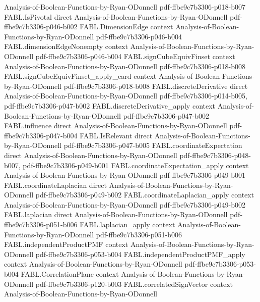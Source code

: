 \begin{theorem}
  {Analysis-of-Boolean-Functions-by-Ryan-ODonnell}
  {pdf-ffbe9c7b3306-p018-b007}
\proofstep
  {FABL.IsPivotal}
  {direct}
  {Analysis-of-Boolean-Functions-by-Ryan-ODonnell}
  {pdf-ffbe9c7b3306-p046-b002}
\proofstep
  {FABL.DimensionEdge}
  {context}
  {Analysis-of-Boolean-Functions-by-Ryan-ODonnell}
  {pdf-ffbe9c7b3306-p046-b004}
\proofstep
  {FABL.dimensionEdgeNonempty}
  {context}
  {Analysis-of-Boolean-Functions-by-Ryan-ODonnell}
  {pdf-ffbe9c7b3306-p046-b004}
\proofstep
  {FABL.signCubeEquivFinset}
  {context}
  {Analysis-of-Boolean-Functions-by-Ryan-ODonnell}
  {pdf-ffbe9c7b3306-p018-b008}
\proofstep
  {FABL.signCubeEquivFinset_apply_card}
  {context}
  {Analysis-of-Boolean-Functions-by-Ryan-ODonnell}
  {pdf-ffbe9c7b3306-p018-b008}
\proofstep
  {FABL.discreteDerivative}
  {direct}
  {Analysis-of-Boolean-Functions-by-Ryan-ODonnell}
  {pdf-ffbe9c7b3306-p014-b005,
    pdf-ffbe9c7b3306-p047-b002}
\proofstep
  {FABL.discreteDerivative_apply}
  {context}
  {Analysis-of-Boolean-Functions-by-Ryan-ODonnell}
  {pdf-ffbe9c7b3306-p047-b002}
\proofstep
  {FABL.influence}
  {direct}
  {Analysis-of-Boolean-Functions-by-Ryan-ODonnell}
  {pdf-ffbe9c7b3306-p047-b004}
\proofstep
  {FABL.IsRelevant}
  {direct}
  {Analysis-of-Boolean-Functions-by-Ryan-ODonnell}
  {pdf-ffbe9c7b3306-p047-b005}
\proofstep
  {FABL.coordinateExpectation}
  {direct}
  {Analysis-of-Boolean-Functions-by-Ryan-ODonnell}
  {pdf-ffbe9c7b3306-p048-b007,
    pdf-ffbe9c7b3306-p049-b001}
\proofstep
  {FABL.coordinateExpectation_apply}
  {context}
  {Analysis-of-Boolean-Functions-by-Ryan-ODonnell}
  {pdf-ffbe9c7b3306-p049-b001}
\proofstep
  {FABL.coordinateLaplacian}
  {direct}
  {Analysis-of-Boolean-Functions-by-Ryan-ODonnell}
  {pdf-ffbe9c7b3306-p049-b002}
\proofstep
  {FABL.coordinateLaplacian_apply}
  {context}
  {Analysis-of-Boolean-Functions-by-Ryan-ODonnell}
  {pdf-ffbe9c7b3306-p049-b002}
\proofstep
  {FABL.laplacian}
  {direct}
  {Analysis-of-Boolean-Functions-by-Ryan-ODonnell}
  {pdf-ffbe9c7b3306-p051-b006}
\proofstep
  {FABL.laplacian_apply}
  {context}
  {Analysis-of-Boolean-Functions-by-Ryan-ODonnell}
  {pdf-ffbe9c7b3306-p051-b006}
\proofstep
  {FABL.independentProductPMF}
  {context}
  {Analysis-of-Boolean-Functions-by-Ryan-ODonnell}
  {pdf-ffbe9c7b3306-p053-b004}
\proofstep
  {FABL.independentProductPMF_apply}
  {context}
  {Analysis-of-Boolean-Functions-by-Ryan-ODonnell}
  {pdf-ffbe9c7b3306-p053-b004}
\proofstep
  {FABL.CorrelationPlane}
  {context}
  {Analysis-of-Boolean-Functions-by-Ryan-ODonnell}
  {pdf-ffbe9c7b3306-p120-b003}
\proofstep
  {FABL.correlatedSignVector}
  {context}
  {Analysis-of-Boolean-Functions-by-Ryan-ODonnell}

\end{theorem}
